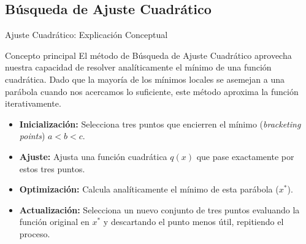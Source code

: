 \subsection{Búsqueda de Ajuste Cuadrático}

\begin{frame}{Ajuste Cuadrático: Explicación Conceptual}
    \begin{block}{Concepto principal}
        \footnotesize
        El método de Búsqueda de Ajuste Cuadrático aprovecha nuestra capacidad de resolver analíticamente el mínimo de una función cuadrática. Dado que la mayoría de los mínimos locales se asemejan a una parábola cuando nos acercamos lo suficiente, este método aproxima la función iterativamente.
    \end{block}

    \scriptsize
    \begin{itemize}
        \item \textbf{Inicialización:} Selecciona tres puntos que encierren el mínimo (\textit{bracketing points}) $a < b < c$.
        \item \textbf{Ajuste:} Ajusta una función cuadrática $q(x)$ que pase exactamente por estos tres puntos.
        \item \textbf{Optimización:} Calcula analíticamente el mínimo de esta parábola ($x^*$).
        \item \textbf{Actualización:} Selecciona un nuevo conjunto de tres puntos evaluando la función original en $x^*$ y descartando el punto menos útil, repitiendo el proceso.
    \end{itemize}
\end{frame}

